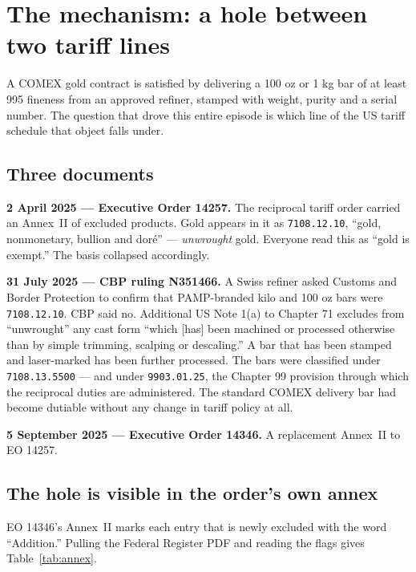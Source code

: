 \documentclass[11pt,a4paper]{article}
\begin{document}
\section{The mechanism: a hole between two tariff lines}
\label{sec:mechanism}

A COMEX gold contract is satisfied by delivering a 100 oz or 1 kg bar of at least 995 fineness
from an approved refiner, stamped with weight, purity and a serial number. The question that
drove this entire episode is which line of the US tariff schedule that object falls under.

\subsection{Three documents}

\textbf{2 April 2025 --- Executive Order 14257.} The reciprocal tariff order carried an
Annex~II of excluded products. Gold appears in it as \texttt{7108.12.10}, ``gold, nonmonetary,
bullion and dor\'e'' --- \emph{unwrought} gold. Everyone read this as ``gold is exempt.'' The
basis collapsed accordingly.

\textbf{31 July 2025 --- CBP ruling N351466.} A Swiss refiner asked Customs and Border
Protection to confirm that PAMP-branded kilo and 100 oz bars were \texttt{7108.12.10}. CBP said
no. Additional US Note 1(a) to Chapter 71 excludes from ``unwrought'' any cast form ``which
[has] been machined or processed otherwise than by simple trimming, scalping or descaling.'' A
bar that has been stamped and laser-marked has been further processed. The bars were classified
under \texttt{7108.13.5500} --- and under \texttt{9903.01.25}, the Chapter 99 provision through
which the reciprocal duties are administered. The standard COMEX delivery bar had become
dutiable without any change in tariff policy at all.

\textbf{5 September 2025 --- Executive Order 14346.} A replacement Annex~II to EO 14257.

\subsection{The hole is visible in the order's own annex}

EO 14346's Annex~II marks each entry that is newly excluded with the word ``Addition.'' Pulling
the Federal Register PDF and reading the flags gives Table~\ref{tab:annex}.
\end{document}
